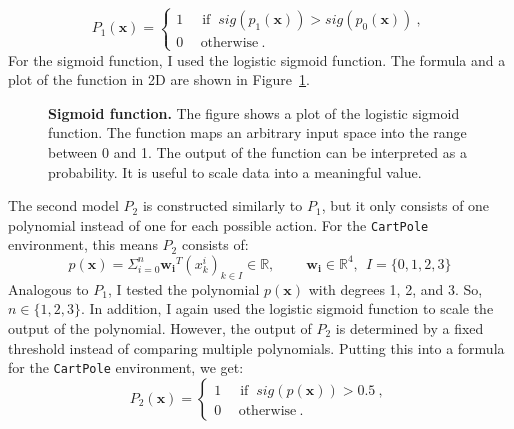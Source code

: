 \[
  P_1(\mathbf{x}) =
  \begin{cases}1~&{\text{ if }}~sig(p_1(\mathbf{x})) > sig(p_0(\mathbf{x}))~,\\0~&~\text{otherwise}~.\end{cases}
\]
For the sigmoid function, I used the logistic sigmoid function. The formula and a plot of the function in 2D are shown in Figure~\ref{fig:sigmoid}.
\begin{figure}[ht]
\centering
{}
\caption[Sigmoid function]{
  \textbf{Sigmoid function.}
  The figure shows a plot of the logistic sigmoid function. The function maps an arbitrary input space into the range between 0 and 1. The output of the function can be interpreted as a probability. It is useful to scale data into a meaningful value.
}
\label{fig:sigmoid}
\end{figure}

The second model $P_2$ is constructed similarly to $P_1$, but it only consists of one polynomial instead of one for each possible action. For the \verb|CartPole| environment, this means $P_2$ consists of:
\[
  p(\mathbf{x}) = \Sigma_{i=0}^{n} \mathbf{w_i}^T (x_k^i)_{k \in I} \in \mathbb{R}, \ \ \ \ \ \ \ \ \ \ \mathbf{w_i} \in \mathbb{R}^4, \ \ I = \{0, 1, 2, 3\}
\]
Analogous to $P_1$, I tested the polynomial $p(\mathbf{x})$ with degrees 1, 2, and 3. So, $n \in \{1, 2, 3\}$. In addition, I again used the logistic sigmoid function to scale the output of the polynomial. However, the output of $P_2$ is determined by a fixed threshold instead of comparing multiple polynomials. Putting this into a formula for the \verb|CartPole| environment, we get:
\[
  P_2(\mathbf{x}) =
  \begin{cases}1~&{\text{ if }}~sig(p(\mathbf{x}))>0.5~,\\0~&~\text{otherwise}~.\end{cases}
\]

